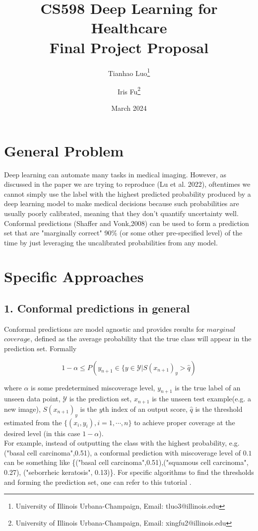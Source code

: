 \documentclass{article}
\title{CS598 Deep Learning for Healthcare\\ Final Project Proposal}
\author{Tianhao Luo\thanks{University of Illinois Urbana-Champaign, Email: tluo3@illinois.edu} \and Iris Fu\thanks{University of Illinois Urbana-Champaign, Email: xingfu2@illinois.edu}}
\date{March 2024}
\begin{document}
\maketitle

\section*{General Problem}
Deep learning can automate many tasks in medical imaging. However, as discussed in the paper we are trying to reproduce (Lu et al. 2022)\cite{Lu_Lemay_Chang_Höbel_Kalpathy-Cramer_2022}, oftentimes we cannot simply use the label with the highest predicted probability produced by a deep learning model to make medical decisions because such probabilities are usually poorly calibrated, meaning that they don't quantify uncertainty well. Conformal predictions (Shaffer and Vonk,2008) \cite{shafer2008tutorial} can be used to form a prediction set that are "marginally correct"  90\% (or some other pre-specified level) of the time by just leveraging the uncalibrated probabilities from any model.

\section*{Specific Approaches}
\subsection*{1. Conformal predictions in general}
Conformal predictions are model agnostic and provides results for $marginal$ $coverage$, defined as the average probability that the true class will appear in the prediction set. Formally


$$1-\alpha \leq P(y_{n+1} \in \{y \in \mathcal{Y} | S(x_{n+1})_y > \hat{q})$$

where $\alpha$ is some predetermined miscoverage level, $y_{n+1}$ is the true label of an unseen data point, $\mathcal{Y}$ is the prediction set, $x_{n+1}$ is the unseen test example(e.g. a new image), $S(x_{n+1})_y$ is the $y$th index of an output score, $\hat{q}$ is the threshold estimated from the $\{(x_i,y_i),i=1,\cdots,n\}$ to achieve proper coverage at the desired level (in this case $1-\alpha$).\\

For example, instead of outputting the class with the highest probability, e.g. ("basal cell carcinoma",0.51), a conformal prediction with miscoverage level of $0.1$ can be something like \{("basal cell carcinoma",0.51),("squamous cell carcinoma", 0.27), ("seborrheic keratosis", 0.13)\}. For specific algorithms to find the thresholds and forming the prediction set, one can refer to this tutorial \cite{angelopoulos2021gentle}.
\end{document}
